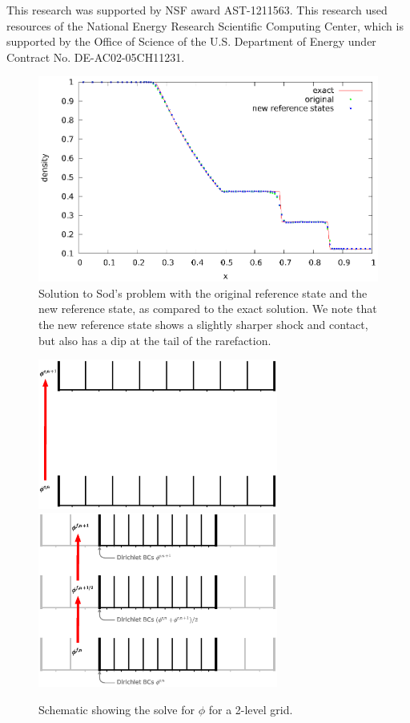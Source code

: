 \documentclass[12pt,preprint]{aastex}
\begin{document}
\acknowledgments

This research was supported by NSF award AST-1211563.
This research used resources of the National Energy Research
Scientific Computing Center, which is supported by the Office of
Science of the U.S. Department of Energy under Contract
No. DE-AC02-05CH11231.


\clearpage




\clearpage

\begin{figure}
  \centering
  \includegraphics[scale=1.0]{reference}
  \caption{ \label{Fig:sod} Solution to Sod's problem with the original
    reference state and the new reference state, as compared to the
    exact solution.  We note that the new reference state shows a
    slightly sharper shock and contact, but also has a dip at the tail
    of the rarefaction.}
\end{figure}

\clearpage

\begin{figure}
  \centering
  \includegraphics[width=3.1in]{nested2}\hspace{1em}
  \includegraphics[width=3.1in]{nested3}
  \caption{\label{fig:2levgrav} Schematic showing the solve for $\phi$ for a 2-level grid.}
\end{figure}
\end{document}
